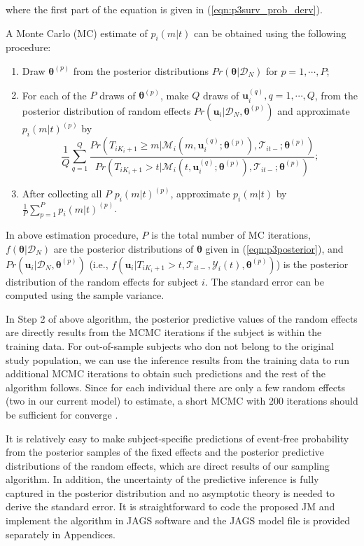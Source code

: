\noindent where the first part of the equation is given in (\ref{eqn:p3surv_prob_derv}).

A Monte Carlo (MC) estimate of $p_i(m|t)$ can be obtained using the following procedure:
\begin{enumerate}
\item Draw $\boldsymbol{\theta}^{(p)}$ from the posterior distributions $Pr(\boldsymbol{\theta}|\mathcal{D}_N)$ for $p=1, \cdots, P$;
\item For each of the $P$ draws of $\boldsymbol{\theta}^{(p)}$, make $Q$ draws of $\boldsymbol{u}_i^{(q)}, q=1, \cdots, Q$, from the posterior distribution of random effects $Pr(\boldsymbol{u}_i|\mathcal{D}_N, \boldsymbol{\theta}^{(p)})$ and approximate $p_i(m|t)^{(p)}$ by
\[\frac{1}{Q}\sum_{q=1}^Q\frac{Pr(T_{iK_i+1}\ge m | \mathcal{M}_{i}(m, \boldsymbol{u}_i^{(q)}; \boldsymbol{\theta}^{(p)}), \mathcal{T}_{it-}; \boldsymbol{\theta}^{(p)})}{Pr(T_{iK_i+1}> t | \mathcal{M}_{i}(t, \boldsymbol{u}_i^{(q)}; \boldsymbol{\theta}^{(p)}), \mathcal{T}_{it-}; \boldsymbol{\theta}^{(p)})};\]
\item After collecting all $P$ $p_i(m|t)^{(p)}$, approximate $p_i(m|t)$ by
$\frac{1}{P} \sum_{p=1}^{P} p_i(m|t)^{(p)}$.
\end{enumerate}

\noindent In above estimation procedure, $P$ is the total number of MC iterations, $f(\boldsymbol{\theta}|\mathcal{D}_N)$ are the posterior distributions of
$\boldsymbol{\theta}$ given in (\ref{eqn:p3posterior}), and $Pr(\boldsymbol{u}_i|\mathcal{D}_N, \boldsymbol{\theta}^{(p)})$ (i.e., $f({\boldsymbol u}_i|T_{iK_i+1}> t, \mathcal{T}_{it-}, \mathcal{Y}_{i}(t), \boldsymbol{\theta}^{(p)})$) is the posterior distribution of the random effects for subject $i$. The standard error can be computed using the sample variance.

In Step 2 of above algorithm, the posterior predictive values of the random effects are directly results from the MCMC iterations if the subject is within the training data. For out-of-sample subjects who don not belong to the original study population, we can use the inference results from the training data to run additional MCMC iterations to obtain such predictions and the rest of the algorithm follows. Since for each individual there are only a few random effects (two in our current model) to estimate, a short MCMC with 200 iterations should be sufficient for converge \citep{taylor2013real}.

It is relatively easy to make subject-specific predictions of event-free probability from the posterior samples of the fixed effects and the posterior predictive distributions of the random effects, which are direct results of our sampling algorithm. In addition, the uncertainty of the predictive inference is fully captured in the posterior distribution and no asymptotic theory is needed to derive the standard error. It is straightforward to code the proposed JM and implement the algorithm in \textsf{JAGS} software \citep{plummer2003jags} and the \textsf{JAGS} model file is provided separately in Appendices.

